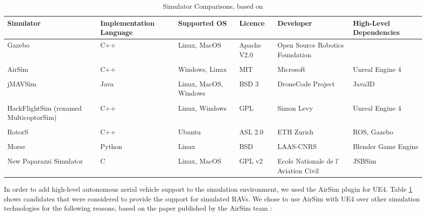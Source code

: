 \begin{center}
\begin{table}[H]
\footnotesize
\centering
\begin{tabular}{ p{2.2cm} p{2.2cm} p{2.3cm} p{1.5cm} p{2.3cm} p{2.3cm}} 
\hline
Simulator & Implementation Language & Supported OS & Licence & Developer & High-Level Dependencies\\
\hline
Gazebo \cite{Koenig2005DesignSimulator} & C++ & Linux, MacOS & Apache V2.0 & Open Source Robotics Foundation & \\
\\
AirSim \cite{Shah2017AirSim:Vehicles} & C++ & Windows, Linux & MIT & Microsoft & Unreal Engine 4\\ 
\\
jMAVSim \cite{jMAVSim} & Java & Linux, MacOS, Windows & BSD 3 & DroneCode Project & Java3D\\
\\
HackFlightSim (renamed MulticoptorSim) \cite{MulticopterSim} & C++ & Linux, Windows & GPL & Simon Levy & Unreal Engine 4 \\
\\
RotorS \cite{RotorS} & C++ & Ubuntu & ASL 2.0 & ETH Zurich & ROS, Gazebo\\
\\
Morse \cite{Morse} & Python & Linux & BSD & LAAS-CNRS & Blender Game Engine \\
\\
New Paparazzi Simulator \cite{NewPapSim} & C & Linux, MacOS & GPL v2 & Ecole Nationale de l’ Aviation Civil & JSBSim\\
\hline
\end{tabular}
\caption{Simulator Comparisons, based on \cite{Ebeid2018ASimulators}}
\label{table:SimulatorComparison}
\end{table}
\end{center}
In order to add high-level autonomous aerial vehicle support to the simulation environment, we used the AirSim \cite{Shah2017AirSim:Vehicles} plugin for UE4. Table \ref{table:SimulatorComparison} shows candidates that were considered to provide the support for simulated RAVs. We chose to use AirSim with UE4 over other simulation technologies for the following reasons, based on the paper published by the AirSim team \cite{Shah2017AirSim:Vehicles}:

